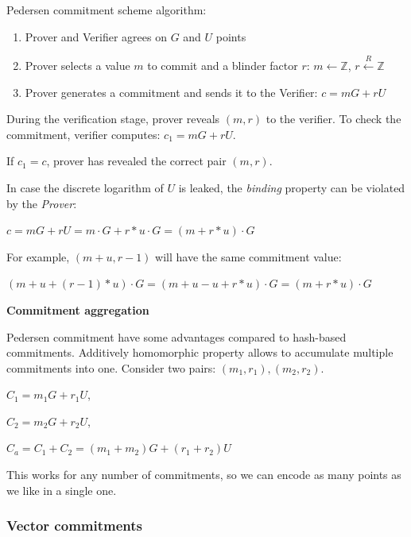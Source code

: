 \documentclass[../lecture-notes.tex]{subfiles}
\begin{document}
Pedersen commitment scheme algorithm:
\begin{enumerate}
    \item Prover and Verifier agrees on $G$ and $U$ points
    \item Prover selects a value $m$ to commit and a blinder factor $r$:
            $m \leftarrow \mathbb{Z}$,
            $r \xleftarrow{R} \mathbb{Z}$
    \item Prover generates a commitment and sends it to the Verifier:
            $c = mG + rU$
\end{enumerate}

During the verification stage, prover reveals $(m, r)$ to the verifier. 
To check the commitment, verifier computes: $c_1 = mG + rU$.

If $c_1 = c$, prover has revealed the correct pair $(m, r)$.

\begin{remark}
    In case the discrete logarithm of $U$ is leaked, the \textit{binding} property can be violated by the \textit{Prover}:

    $c = mG + rU = m \cdot G + r*u \cdot G = (m + r*u) \cdot G$
    
    For example, $(m + u, r - 1)$ will have the same commitment value:

    $(m+u + (r-1)*u) \cdot G = (m + u - u + r*u) \cdot G = (m + r*u) \cdot G$ 
        
\end{remark}

\textbf{Commitment aggregation}

Pedersen commitment have some advantages compared to hash-based commitments.
Additively homomorphic property allows to accumulate multiple commitments into one.
Consider two pairs: $(m_1, r_1), (m_2, r_2)$.

\begin{center}
    $C_1 = m_1G + r_1U$,

    $C_2 = m_2G + r_2U$,

    $C_a = C_1 + C_2 = (m_1 + m_2)G + (r_1 + r_2)U$
\end{center}

This works for any number of commitments, so we can encode as many points as we like in a single one.

\vspace{0.5 cm}

\subsubsection{Vector commitments}
\end{document}
